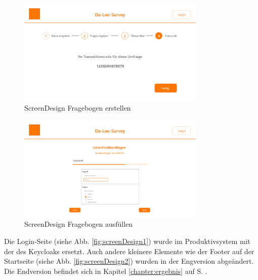 \begin{figure}[H]
    \includegraphics[width=0.8\textwidth]{pics/Erstellen_Umfarage_4.png}
    \centering
    \caption{ScreenDesign Fragebogen erstellen}
\end{figure}

\begin{figure}[H]
    \includegraphics[width=0.8\textwidth]{pics/Fargebogen ausfuellen.png}
    \centering
    \caption{ScreenDesign Fragebogen ausfüllen}
\end{figure}

Die Login-Seite (siehe Abb. \ref{fig:screenDesign1}) wurde im Produktivsystem mit der des Keycloaks ersetzt. Auch andere kleinere Elemente wie der 
Footer auf der Startseite (siehe Abb. \ref{fig:screenDesign2}) wurden in der Engversion abgeändert. Die Endversion befindet sich in Kapitel 
\ref{chapter:ergebnis} auf S. \pageref{chapter:ergebnis}.